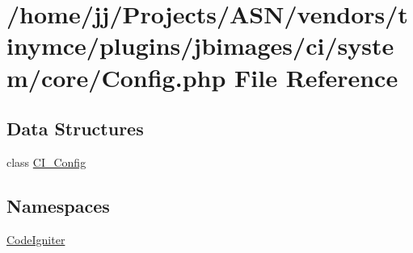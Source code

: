 \hypertarget{_config_8php}{}\section{/home/jj/\+Projects/\+A\+S\+N/vendors/tinymce/plugins/jbimages/ci/system/core/\+Config.php File Reference}
\label{_config_8php}
\subsection*{Data Structures}
\begin{DoxyCompactItemize}
\item 
class \hyperlink{class_c_i___config}{C\+I\+\_\+\+Config}
\end{DoxyCompactItemize}
\subsection*{Namespaces}
\begin{DoxyCompactItemize}
\item 
 \hyperlink{namespace_code_igniter}{Code\+Igniter}
\end{DoxyCompactItemize}

